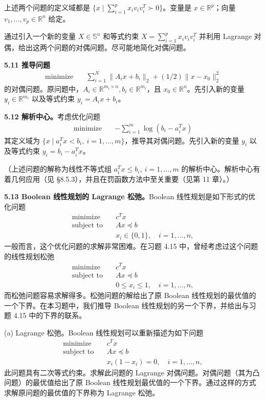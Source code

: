 \documentclass[UTF8, 12pt, fontset=fandol, oneside]{ctexart}
\begin{document}
上述两个问题的定义域都是 $\{x\mid \sum_{i=1}^p x_iv_iv_i^T\succ 0\}$。变量是 $x\in\mathbb{R}^p$；向量 $v_1,\ldots,v_p\in\mathbb{R}^n$ 给定。

通过引入一个新的变量 $X\in\mathbb{S}^n$ 和等式约束 $X=\sum_{i=1}^p x_iv_iv_i^T$ 并利用 Lagrange 对偶，给出这两个问题的对偶问题。尽可能地简化对偶问题。

\noindent\textbf{5.11 推导问题}
\[
\begin{aligned}
\text{minimize}\quad & \sum_{i=1}^N\|A_ix+b_i\|_2+(1/2)\|x-x_0\|_2^2
\end{aligned}
\]
的对偶问题。原问题中，$A_i\in\mathbb{R}^{m_i\times n}, b_i\in\mathbb{R}^{m_i}$，且 $x_0\in\mathbb{R}^n$。先引入新的变量 $y_i\in\mathbb{R}^{m_i}$ 以及等式约束 $y_i=A_ix+b_i$。

\noindent\textbf{5.12 解析中心。}\quad 考虑优化问题
\[
\begin{aligned}
\text{minimize}\quad & -\sum_{i=1}^m\log(b_i-a_i^Tx)
\end{aligned}
\]
其定义域为 $\{x\mid a_i^Tx<b_i,\ i=1,\ldots,m\}$，推导其对偶问题。先引入新的变量 $y_i$ 以及等式约束 $y_i=b_i-a_i^Tx$。

（上述问题的解称为线性不等式组 $a_i^Tx\leq b_i,\ i=1,\ldots,m$ 的解析中心。解析中心有着几何应用（见 §8.5.3），并且在罚函数方法中至关重要（见第 11 章）。）

\noindent\textbf{5.13 Boolean 线性规划的 Lagrange 松弛。}\quad Boolean 线性规划是如下形式的优化问题
\[
\begin{aligned}
\text{minimize}\quad & c^Tx\\
\text{subject to}\quad & Ax\preceq b\\
& x_i\in\{0,1\},\quad i=1,\ldots,n,
\end{aligned}
\]
一般而言，这个优化问题的求解非常困难。在习题 4.15 中，曾经考虑过这个问题的线性规划松弛
\begin{equation}
\begin{aligned}
\text{minimize}\quad & c^Tx\\
\text{subject to}\quad & Ax\preceq b\\
& 0\leq x_i\leq 1,\quad i=1,\ldots,n,
\end{aligned}
\tag{5.107}
\end{equation}
而松弛问题容易求解得多。松弛问题的解给出了原 Boolean 线性规划的最优值的一个下界。在本习题中，我们推导 Boolean 线性规划的另一个下界，并给出与习题 4.15 中的下界的联系。

(a) Lagrange 松弛。Boolean 线性规划可以重新描述为如下问题
\[
\begin{aligned}
\text{minimize}\quad & c^Tx\\
\text{subject to}\quad & Ax\preceq b\\
& x_i(1-x_i)=0,\quad i=1,\ldots,n,
\end{aligned}
\]
此问题具有二次等式约束。求解此问题的 Lagrange 对偶问题。对偶问题（其为凸问题）的最优值给出了原 Boolean 线性规划最优值的一个下界。通过这样的方式求解原问题的最优值的下界称为 Lagrange 松弛。
\end{document}
